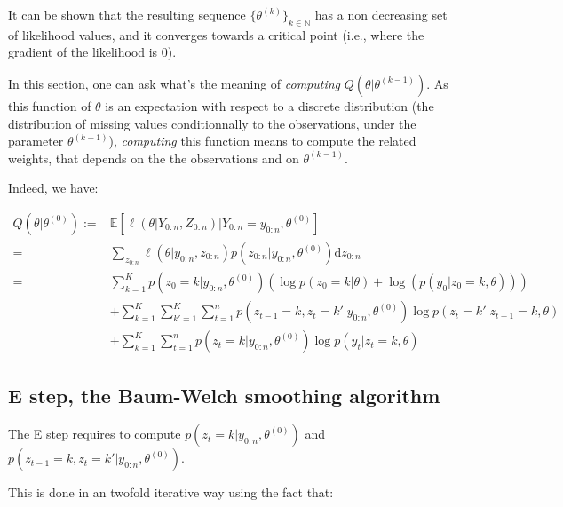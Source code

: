 \documentclass[]{book}
\begin{document}
It can be shown that the resulting sequence
\(\lbrace\theta^{(k)} \rbrace_{k \in \mathbb{N}}\) has a non decreasing
set of likelihood values, and it converges towards a critical point
(i.e., where the gradient of the likelihood is 0).

In this section, one can ask what's the meaning of \emph{computing}
\(Q(\theta \vert \theta^{(k-1)})\). As this function of \(\theta\) is an
expectation with respect to a discrete distribution (the distribution of
missing values conditionnally to the observations, under the parameter
\(\theta^{(k-1)}\)), \emph{computing} this function means to compute the
related weights, that depends on the the observations and on
\(\theta^{(k-1)}\).

Indeed, we have:

\begin{align}
Q(\theta \vert \theta^{(0)}) :=& \mathbb{E}[\ell(\theta \vert Y_{0:n}, Z_{0:n}) \vert Y_{0:n} = y_{0:n}, \theta^{(0)}]\nonumber \\
=& \sum_{z_{0:n}} \ell(\theta \vert y_{0:n}, z_{0:n}) p(z_{0:n} \vert y_{0:n}, \theta^{(0)}) \text{d} z_{0:n} \nonumber \\
=& \sum_{k = 1}^K p(z_0 = k \vert y_{0:n}, \theta^{(0)})\left(\log p(z_0 = k \vert \theta) + \log(p(y_0 \vert z_0 = k, \theta))\right)  \nonumber \\
& + \sum_{k = 1}^K\sum_{k' = 1}^K \sum_{t = 1}^n p(z_{t-1} = k, z_{t} = k'\vert y_{0:n}, \theta^{(0)}) \log p(z_{t} = k' \vert z_{t - 1} = k,\theta) \nonumber \\
& + \sum_{k = 1}^K \sum_{t = 1}^n p(z_t = k\vert y_{0:n}, \theta^{(0)}) \log p(y_{t} \vert z_{t} = k, \theta) \nonumber
\end{align}

\subsection{E step, the Baum-Welch smoothing
algorithm}\label{e-step-the-baum-welch-smoothing-algorithm}

The E step requires to compute
\(p(z_t = k \vert y_{0:n}, \theta^{(0)})\) and
\(p(z_{t - 1} = k, z_{t} = k' \vert y_{0:n}, \theta^{(0)})\).

This is done in an twofold iterative way using the fact that:
\end{document}
